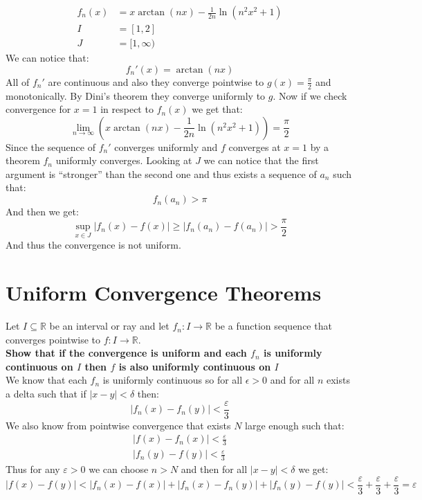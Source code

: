 \documentclass{article}
\theoremstyle{plain}
\newcommand{\R}{\mathbb{R}}
\begin{document}
	\begin{align*}
		f_n(x) &= x\arctan(nx)-\frac{1}{2n}\ln(n^2x^2+1) \\
		I &= [1,2] \\
		J &= [1,\infty)
	\end{align*}
	We can notice that:
	\[
		f_n'(x) = \arctan(nx)
	\]
	All of $f_n'$ are continuous and also they converge pointwise to 
	$g(x) = \frac{\pi}{2}$ and monotonically. By Dini's theorem they
	converge uniformly to $g$. Now if we check convergence for $x=1$
	in respect to $f_n(x)$ we get that:
	\[
		\lim_{n\to\infty}{
		\left(
		x\arctan(nx)-\frac{1}{2n}\ln(n^2x^2+1)
		\right)} = 
		\frac{\pi}{2}
	\]
	Since the sequence of $f_n'$ converges uniformly and $f$ converges at
	$x=1$ by a theorem $f_n$ uniformly converges. Looking at $J$ we
	can notice that the first argument is ``stronger'' than the second
	one and thus exists a sequence of $a_n$ such that:
	\[
		f_n(a_n) > \pi
	\]
	And then we get:
	\[
		\sup_{x\in J}|f_n(x) - f(x)| \geq 
		|f_n(a_n) - f(a_n)| >
		\frac{\pi}{2}
	\]
	And thus the convergence is not uniform.
	
	\newpage
	
	\section{Uniform Convergence Theorems}
	Let $I\subseteq\R$ be an interval or ray and let $f_n\colon I\to\R$ be a 
	function sequence that converges pointwise to $f\colon I\to\R$. \\
	\textbf{Show that if the convergence is uniform and each $f_n$ is
	uniformly continuous on $I$ then $f$ is also uniformly continuous on $I$}
	\\
	We know that each $f_n$ is uniformly continuous so for all $\epsilon >0$
	and for all $n$ exists a delta such that if $|x-y| < \delta$ then:
	\[
		|f_n(x) - f_n(y)| < \frac{\varepsilon}{3}
	\]
	We also know from pointwise convergence that exists $N$ large enough such
	that:
	\begin{align*}
		|f(x) - f_n(x)| < \frac{\varepsilon}{3} \\
		|f_n(y) - f(y)| < \frac{\varepsilon}{3}
	\end{align*}
	Thus for any $\varepsilon > 0$ we can choose $n > N$ and then for
	all $|x-y| < \delta$ we get:
	\[
		|f(x) - f(y)| < 
		|f_n(x) - f(x)| + |f_n(x) - f_n(y)| + |f_n(y) - f(y)| < 
		\frac{\varepsilon}{3} + 
		\frac{\varepsilon}{3} + \frac{\varepsilon}{3} = \varepsilon
	\]
	
	\newpage
	
\end{document}
